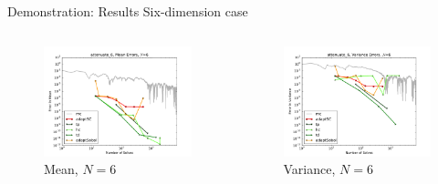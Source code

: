 \documentclass[t,9pt,svgnames]{beamer}
\begin{document}
\begin{frame}{Demonstration: Results}
  Six-dimension case
  \begin{columns}
    \begin{column}{0.5\textwidth}
      \begin{figure}
        \centering
        \includegraphics[width=\linewidth]{./attenuate/attenuate_6_mean_errs}
        \caption{Mean, $N=6$}
      \end{figure}
    \end{column}
    \begin{column}{0.5\textwidth}
      \begin{figure}
        \centering
        \includegraphics[width=\linewidth]{./attenuate/attenuate_6_variance_errs}
        \caption{Variance, $N=6$}
      \end{figure}
    \end{column}
  \end{columns}
\end{frame}
\end{document}
